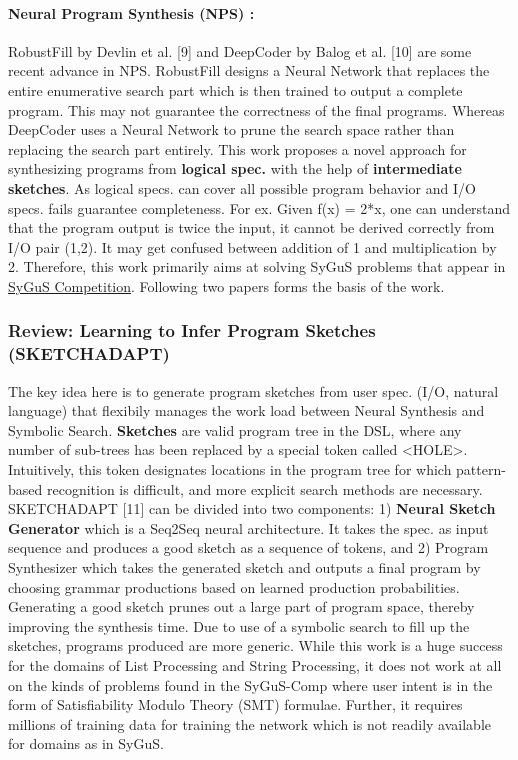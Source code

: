 \paragraph{Neural Program Synthesis (NPS) :}
RobustFill by Devlin et al. [9] and DeepCoder by Balog et al. [10] are some recent advance in NPS. RobustFill designs a Neural Network that replaces the entire enumerative search part which is then trained to output a complete program. This may not guarantee the correctness of the final programs. Whereas DeepCoder uses a Neural Network to prune the search space rather than replacing the search part entirely.
This work proposes a novel approach for synthesizing programs from \textbf{logical spec.} with the help of \textbf{intermediate sketches}. As logical specs. can cover all possible program behavior and I/O specs. fails guarantee completeness. For ex. Given f(x) = 2*x, one can understand that the program output is twice the input, it cannot be derived correctly from I/O pair (1,2). It may get confused between addition of 1 and multiplication by 2. Therefore, this work primarily aims at solving SyGuS problems that appear in \href{https://sygus.org/}{SyGuS Competition}. Following two papers forms the basis of the work.

\subsubsection{Review: Learning to Infer Program Sketches (SKETCHADAPT)}
The key idea here is to generate program sketches from user spec. (I/O, natural language) that flexibily manages the work load between Neural Synthesis and Symbolic Search. \textbf{Sketches} are valid program tree in the DSL, where any number of sub-trees has been replaced by a special token called <HOLE>. Intuitively, this token designates locations in the program tree for which pattern-based recognition is difficult, and more explicit search methods are necessary. SKETCHADAPT [11] can be divided into two components: 1) \textbf{Neural Sketch Generator} which is a Seq2Seq neural architecture. It takes the spec. as input sequence and produces a good sketch as a sequence of tokens, and 2) Program Synthesizer which takes the generated sketch and outputs a final program by choosing grammar productions based on learned production probabilities. Generating a good sketch prunes out a large part of program space, thereby improving the synthesis time. Due to use of a symbolic search to fill up the sketches, programs produced are more generic. While this work is a huge success for the domains of List Processing and String Processing, it does not work at all on the kinds of problems found in the SyGuS-Comp where user intent is in the form of Satisfiability Modulo Theory (SMT) formulae. Further, it requires millions of training data for training the network which is not readily available for domains as in SyGuS.


